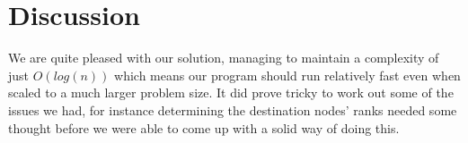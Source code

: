 \documentclass[a4paper,12px]{article}
\begin{document}
\section{Discussion}
We are quite pleased with our solution, managing to maintain a complexity of
just $O(log(n))$ which means our program should run relatively fast even when
scaled to a much larger problem size. It did prove tricky to work out some of
the issues we had, for instance determining the destination nodes' ranks needed
some thought before we were able to come up with a solid way of doing this.


%
%
\end{document}
